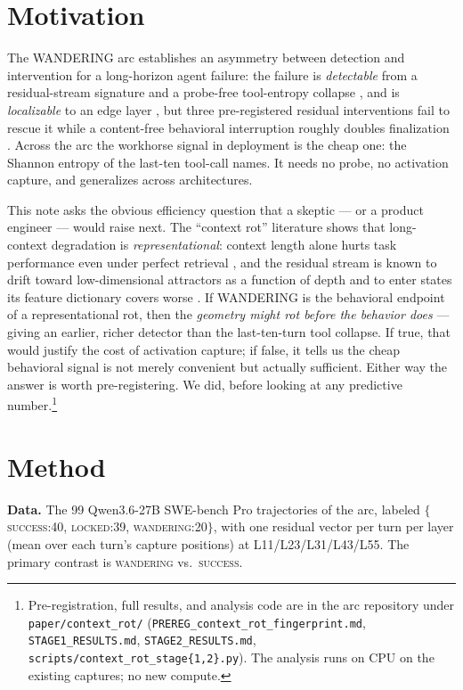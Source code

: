 \documentclass[11pt]{article}
\begin{document}
\section{Motivation}\label{sec:motivation}

The WANDERING arc establishes an asymmetry between detection and intervention for a long-horizon agent failure: the failure is \emph{detectable} from a residual-stream signature \cite{tool_entropy} and a probe-free tool-entropy collapse \cite{tool_entropy}, and is \emph{localizable} to an edge layer \cite{multichannel}, but three pre-registered residual interventions fail to rescue it \cite{residual_nulls} while a content-free behavioral interruption roughly doubles finalization \cite{modality}. Across the arc the workhorse signal in deployment is the cheap one: the Shannon entropy of the last-ten tool-call names. It needs no probe, no activation capture, and generalizes across architectures.

This note asks the obvious efficiency question that a skeptic --- or a product engineer --- would raise next. The ``context rot'' literature shows that long-context degradation is \emph{representational}: context length alone hurts task performance even under perfect retrieval \cite{contextrot}, and the residual stream is known to drift toward low-dimensional attractors as a function of depth \cite{attractors} and to enter states its feature dictionary covers worse \cite{darkmatter}. If WANDERING is the behavioral endpoint of a representational rot, then the \emph{geometry might rot before the behavior does} --- giving an earlier, richer detector than the last-ten-turn tool collapse. If true, that would justify the cost of activation capture; if false, it tells us the cheap behavioral signal is not merely convenient but actually sufficient. Either way the answer is worth pre-registering. We did, before looking at any predictive number.\footnote{Pre-registration, full results, and analysis code are in the arc repository under \texttt{paper/context\_rot/} (\texttt{PREREG\_context\_rot\_fingerprint.md}, \texttt{STAGE1\_RESULTS.md}, \texttt{STAGE2\_RESULTS.md}, \texttt{scripts/context\_rot\_stage\{1,2\}.py}). The analysis runs on CPU on the existing captures; no new compute.}

\section{Method}\label{sec:method}

\textbf{Data.} The 99 Qwen3.6-27B SWE-bench Pro trajectories of the arc, labeled $\{$\textsc{success}:40, \textsc{locked}:39, \textsc{wandering}:20$\}$, with one residual vector per turn per layer (mean over each turn's capture positions) at L11/L23/L31/L43/L55. The primary contrast is \textsc{wandering} vs.\ \textsc{success}.
\end{document}
